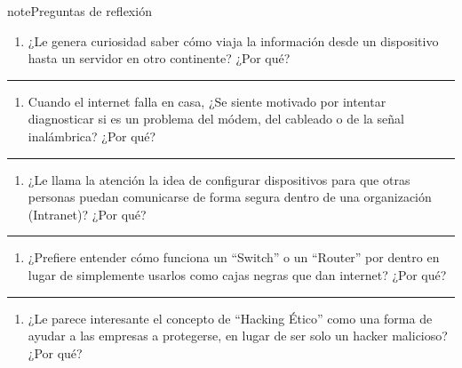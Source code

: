 \documentclass[letterpaper,10pt,spanish]{sphinxmanual}
\begin{document}
\begin{sphinxadmonition}{note}{Preguntas de reflexión}
\begin{enumerate}
%
\item {} 
\sphinxAtStartPar
¿Le genera curiosidad saber cómo viaja la información desde un dispositivo hasta un servidor en otro continente? ¿Por qué?

\end{enumerate}


\bigskip\hrule\bigskip

\begin{enumerate}
%
\setcounter{enumi}{1}
\item {} 
\sphinxAtStartPar
Cuando el internet falla en casa, ¿Se siente motivado por intentar diagnosticar si es un problema del módem, del cableado o de la señal inalámbrica? ¿Por qué?

\end{enumerate}


\bigskip\hrule\bigskip

\begin{enumerate}
%
\setcounter{enumi}{2}
\item {} 
\sphinxAtStartPar
¿Le llama la atención la idea de configurar dispositivos para que otras personas puedan comunicarse de forma segura dentro de una organización (Intranet)? ¿Por qué?

\end{enumerate}


\bigskip\hrule\bigskip

\begin{enumerate}
%
\setcounter{enumi}{3}
\item {} 
\sphinxAtStartPar
¿Prefiere entender cómo funciona un “Switch” o un “Router” por dentro en lugar de simplemente usarlos como cajas negras que dan internet? ¿Por qué?

\end{enumerate}


\bigskip\hrule\bigskip

\begin{enumerate}
%
\setcounter{enumi}{4}
\item {} 
\sphinxAtStartPar
¿Le parece interesante el concepto de “Hacking Ético” como una forma de ayudar a las empresas a protegerse, en lugar de ser solo un hacker malicioso? ¿Por qué?


\end{enumerate}
\end{sphinxadmonition}
\end{document}
